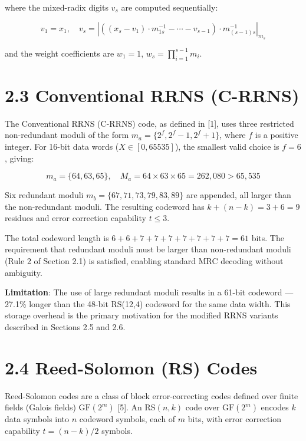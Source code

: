 \documentclass[
  12pt,
  a4paper]{report}
\begin{document}
where the mixed-radix digits \(v_s\) are computed sequentially:

\[v_1 = x_1, \quad v_s = \left| \left( (x_s - v_1) \cdot m_{1s}^{-1} - \cdots - v_{s-1} \right) \cdot m_{(s-1)s}^{-1} \right|_{m_s}\]

and the weight coefficients are \(w_1 = 1\),
\(w_s = \prod_{i=1}^{s-1} m_i\).

\section{2.3 Conventional RRNS (C-RRNS)}\label{conventional-rrns-c-rrns}

The Conventional RRNS (C-RRNS) code, as defined in {[}1{]}, uses three
restricted non-redundant moduli of the form
\(m_a = \{2^f, 2^f - 1, 2^f + 1\}\), where \(f\) is a positive integer.
For 16-bit data words (\(X \in [0, 65535]\)), the smallest valid choice
is \(f = 6\), giving:

\[m_a = \{64, 63, 65\}, \quad M_a = 64 \times 63 \times 65 = 262{,}080 > 65{,}535\]

Six redundant moduli \(m_b = \{67, 71, 73, 79, 83, 89\}\) are appended,
all larger than the non-redundant moduli. The resulting codeword has
\(k + (n-k) = 3 + 6 = 9\) residues and error correction capability
\(t \leq 3\).

The total codeword length is \(6 + 6 + 7 + 7 + 7 + 7 + 7 + 7 + 7 = 61\)
bits. The requirement that redundant moduli must be larger than
non-redundant moduli (Rule 2 of Section 2.1) is satisfied, enabling
standard MRC decoding without ambiguity.

\textbf{Limitation}: The use of large redundant moduli results in a
61-bit codeword --- 27.1\% longer than the 48-bit RS(12,4) codeword for
the same data width. This storage overhead is the primary motivation for
the modified RRNS variants described in Sections 2.5 and 2.6.

\section{2.4 Reed-Solomon (RS) Codes}\label{reed-solomon-rs-codes}

Reed-Solomon codes are a class of block error-correcting codes defined
over finite fields (Galois fields) \(\text{GF}(2^m)\) {[}5{]}. An
RS\((n, k)\) code over \(\text{GF}(2^m)\) encodes \(k\) data symbols
into \(n\) codeword symbols, each of \(m\) bits, with error correction
capability \(t = (n-k)/2\) symbols.
\end{document}
